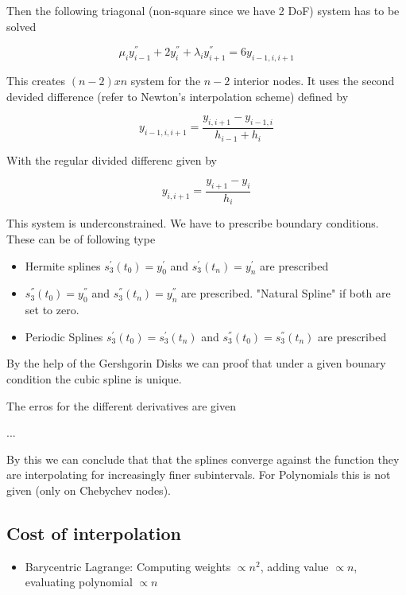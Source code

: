 \documentclass[
    a4paper,
    11pt
]{article}
\begin{document}
Then the following triagonal (non-square since we have 2 DoF) system has to be
solved

\begin{equation}
    \mu_i y_{i-1}^{''} + 2y_i^{''} + \lambda_i y_{i+1}^{''} = 6 y_{i-1,i,i+1}
\end{equation}

This creates $(n-2) x n$ system for the $n-2$ interior nodes. It uses the second
devided difference (refer to Newton's interpolation scheme) defined by

\begin{equation}
    y_{i-1,i,i+1} = \frac{y_{i,i+1} - y_{i-1,i}}{h_{i-1} + h_i}
\end{equation}

With the regular divided differenc given by

\begin{equation}
    y_{i, i+1} = \frac{y_{i+1} - y_i}{h_{i}}
\end{equation}

This system is underconstrained. We have to prescribe boundary conditions. These
can be of following type

\begin{itemize}
    \item Hermite splines $s_3^{'}(t_0) = y_0^{'}$ and $s_3^{'}(t_n) = y_n^{'}$ are
        prescribed
    \item $s_3^{''}(t_0) = y_0^{''}$ and $s_3^{''}(t_n) = y_n^{''}$ are
        prescribed. "Natural Spline" if both are set to zero.
    \item Periodic Splines $s_3^{'}(t_0) = s_3^{'}(t_n)$ and $s_3^{''}(t_0) =
        s_3^{''}(t_n)$ are prescribed
\end{itemize}

By the help of the Gershgorin Disks we can proof that under a given bounary
condition the cubic spline is unique.

The erros for the different derivatives are given

...

By this we can conclude that that the splines converge against the function they
are interpolating for increasingly finer subintervals. For Polynomials this is
not given (only on Chebychev nodes).

\subsection{Cost of interpolation}

\begin{itemize}
    \item Barycentric Lagrange: Computing weights $\propto n^2$, adding value
        $\propto n$, evaluating polynomial $\propto n$
    
\end{itemize}
\end{document}
